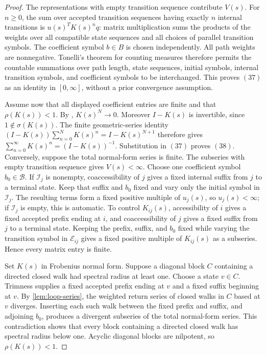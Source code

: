 \documentclass[11pt]{article}
\theoremstyle{definition}
\begin{document}
\begin{proof}
The representations with empty transition sequence contribute $V(s)$.  For $n\ge0$, the
sum over accepted transition sequences having exactly $n$ internal transitions is
$u(s)^TK(s)^nq$: matrix multiplication sums the products of the weights over all compatible
state sequences and all choices of parallel transition symbols.  The coefficient symbol \(b\in B\) is chosen independently.  All
path weights are nonnegative.  Tonelli's theorem for counting
measures
\cite[Theorem~2.37, p.~67]{FollandRealAnalysis}
therefore permits the countable summations over path length, state
sequences, initial symbols, internal transition symbols, and
coefficient symbols to be interchanged.  This proves \((37)\) as
an identity in \([0,\infty]\), without a prior convergence
assumption.

Assume now that all displayed coefficient entries are finite and
that \(\rho(K(s))<1\).  By
\cite[Theorem~5.6.12]{HornJohnson2013},
$
  K(s)^N\longrightarrow0.
$
Moreover \(I-K(s)\) is invertible, since
\(1\notin\sigma(K(s))\).  The finite geometric-series identity
$
  (I-K(s))\sum_{n=0}^{N}K(s)^n
  =
  I-K(s)^{N+1}
$
therefore gives
$
  \sum_{n=0}^{\infty}K(s)^n
  =
  (I-K(s))^{-1}.
$
Substitution in \((37)\) proves \((38)\).
Conversely, suppose the total normal-form series is finite.  The subseries with empty
transition sequence gives $V(s)<\infty$.  Choose one coefficient symbol
$b_0\in\mathcal B$.  If $\mathcal I_j$ is nonempty, coaccessibility of $j$ gives a fixed
internal suffix from $j$ to a terminal state.  Keep that suffix and $b_0$ fixed and vary only
the initial symbol in $\mathcal I_j$.  The resulting terms form a fixed positive multiple of
$u_j(s)$, so $u_j(s)<\infty$; if $\mathcal I_j$ is empty, this is automatic.  To control
$K_{ij}(s)$, accessibility of $i$ gives a fixed accepted prefix ending at $i$, and
coaccessibility of $j$ gives a fixed suffix from $j$ to a terminal state.  Keeping the prefix,
suffix, and $b_0$ fixed while varying the transition symbol in $\mathcal E_{ij}$ gives a fixed
positive multiple of $K_{ij}(s)$ as a subseries.  Hence every matrix entry is finite.

Set $K(s)$ in Frobenius normal form.  Suppose a diagonal block $C$ containing a directed closed walk had spectral
radius at least one.  Choose a state $v\in C$.  Trimness supplies a fixed accepted prefix
ending at $v$ and a fixed suffix beginning at $v$.  By
\cref{lem:loop-series}, the weighted return series of closed walks in $C$ based at $v$
diverges.  Inserting each such walk between the fixed prefix and suffix, and adjoining
$b_0$, produces a divergent subseries of the total normal-form series.  This contradiction
shows that every block containing a directed closed walk has spectral radius below one.  Acyclic diagonal blocks are
nilpotent, so $\rho(K(s))<1$.


\end{proof}
\end{document}
